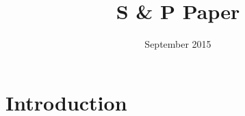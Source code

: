\documentclass{article}
\title{S & P Paper}
\author{ }
\date{September 2015}
\begin{document}
\maketitle

\section{Introduction}
\end{document}
